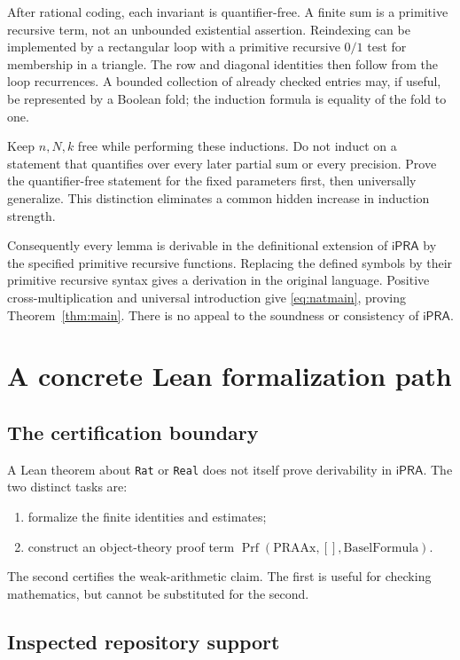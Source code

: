 \documentclass[11pt,a4paper]{article}
\theoremstyle{remark}\newtheorem{remark}[theorem]{Remark}
\newcommand{\ipra}{\mathsf{iPRA}}
\DeclareMathOperator{\Prf}{Prf}
\begin{document}
After rational coding, each invariant is quantifier-free. A finite
sum is a primitive recursive term, not an unbounded existential
assertion. Reindexing can be implemented by a rectangular loop
with a primitive recursive $0/1$ test for membership in a triangle.
The row and diagonal identities then follow from the loop
recurrences. A bounded collection of already checked entries may,
if useful, be represented by a Boolean fold; the induction formula
is equality of the fold to one.

Keep $n,N,k$ free while performing these inductions. Do not induct
on a statement that quantifies over every later partial sum or
every precision. Prove the quantifier-free statement for the fixed
parameters first, then universally generalize. This distinction
eliminates a common hidden increase in induction strength.

Consequently every lemma is derivable in the definitional extension
of $\ipra$ by the specified primitive recursive functions.
Replacing the defined symbols by their primitive recursive syntax
gives a derivation in the original language. Positive
cross-multiplication and universal introduction give
\eqref{eq:natmain}, proving Theorem~\ref{thm:main}.
There is no appeal to the soundness or consistency of $\ipra$.

\section{A concrete Lean formalization path}\label{sec:lean}

\subsection{The certification boundary}

A Lean theorem about \texttt{Rat} or \texttt{Real} does not itself
prove derivability in $\ipra$. The two distinct tasks are:
\begin{enumerate}
\item formalize the finite identities and estimates;
\item construct an object-theory proof term
$\Prf(\mathrm{PRAAx},[],\mathrm{BaselFormula})$.
\end{enumerate}
The second certifies the weak-arithmetic claim. The first is useful
for checking mathematics, but cannot be substituted for the second.

\subsection{Inspected repository support}
\end{document}
